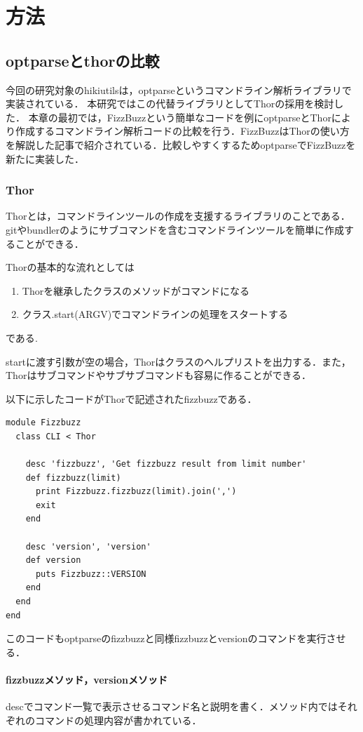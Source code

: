 
\section{方法}
\subsection{optparseとthorの比較}
今回の研究対象のhikiutilsは，optparseというコマンドライン解析ライブラリで実装されている．
本研究ではこの代替ライブラリとしてThorの採用を検討した．
本章の最初では，FizzBuzzという簡単なコードを例にoptparseとThorにより作成するコマンドライン解析コードの比較を行う．FizzBuzzはThorの使い方を解説した記事\cite{1-2}で紹介されている．比較しやすくするためoptparseでFizzBuzzを新たに実装した．

\subsubsection{Thor}
Thorとは，コマンドラインツールの作成を支援するライブラリのことである．gitやbundlerのようにサブコマンドを含むコマンドラインツールを簡単に作成することができる\cite{1-2}．

Thorの基本的な流れとしては

\begin{enumerate}
\item Thorを継承したクラスのメソッドがコマンドになる
\item クラス.start(ARGV)でコマンドラインの処理をスタートする
\end{enumerate}
である\cite{1-2}.

startに渡す引数が空の場合，Thorはクラスのヘルプリストを出力する．また，Thorはサブコマンドやサブサブコマンドも容易に作ることができる．

以下に示したコードがThorで記述されたfizzbuzzである．
\begin{lstlisting}[style=customRuby,basicstyle={\scriptsize\ttfamily}]
module Fizzbuzz                                                   
  class CLI < Thor

    desc 'fizzbuzz', 'Get fizzbuzz result from limit number'
    def fizzbuzz(limit)
      print Fizzbuzz.fizzbuzz(limit).join(',')
      exit
    end

    desc 'version', 'version'
    def version
      puts Fizzbuzz::VERSION
    end
  end
end
\end{lstlisting}
このコードもoptparseのfizzbuzzと同様fizzbuzzとversionのコマンドを実行させる．

\paragraph{fizzbuzzメソッド，versionメソッド}
descでコマンド一覧で表示させるコマンド名と説明を書く．メソッド内ではそれぞれのコマンドの処理内容が書かれている．

